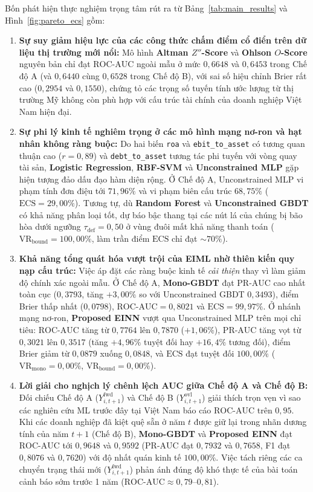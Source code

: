 \documentclass[11pt,a4paper]{article}
\begin{document}
Bốn phát hiện thực nghiệm trọng tâm rút ra từ Bảng~\ref{tab:main_results} và Hình~\ref{fig:pareto_ecs} gồm:
\begin{enumerate}
    \item \textbf{Sự suy giảm hiệu lực của các công thức chấm điểm cổ điển trên dữ liệu thị trường mới nổi:} Mô hình \textbf{Altman $Z''$-Score} và \textbf{Ohlson $O$-Score} nguyên bản chỉ đạt $\text{ROC-AUC}$ ngoài mẫu ở mức $0,6648$ và $0,6453$ trong Chế độ A (và $0,6440$ cùng $0,6528$ trong Chế độ B), với sai số hiệu chỉnh Brier rất cao ($0,2954$ và $0,1550$), chứng tỏ các trọng số tuyến tính ước lượng từ thị trường Mỹ không còn phù hợp với cấu trúc tài chính của doanh nghiệp Việt Nam hiện đại.
    \item \textbf{Sự phi lý kinh tế nghiêm trọng ở các mô hình mạng nơ-ron và hạt nhân không ràng buộc:} Do hai biến \texttt{roa} và \texttt{ebit\_to\_asset} có tương quan thuận cao ($r = 0,89$) và \texttt{debt\_to\_asset} tương tác phi tuyến với vòng quay tài sản, \textbf{Logistic Regression}, \textbf{RBF-SVM} và \textbf{Unconstrained MLP} gặp hiện tượng đảo dấu đạo hàm diện rộng. Ở Chế độ A, Unconstrained MLP vi phạm tính đơn điệu tới $71,96\%$ và vi phạm biên cấu trúc $68,75\%$ ($\text{ECS} = 29,00\%$). Tương tự, dù \textbf{Random Forest} và \textbf{Unconstrained GBDT} có khả năng phân loại tốt, dự báo bậc thang tại các nút lá của chúng bị bão hòa dưới ngưỡng $\tau_{\text{def}} = 0,50$ ở vùng đuôi mất khả năng thanh toán ($\text{VR}_{\text{bound}} = 100,00\%$, làm trần điểm $\text{ECS}$ chỉ đạt $\sim 70\%$).
    \item \textbf{Khả năng tổng quát hóa vượt trội của EIML nhờ thiên kiến quy nạp cấu trúc:} Việc áp đặt các ràng buộc kinh tế \textit{cải thiện} thay vì làm giảm độ chính xác ngoài mẫu. Ở Chế độ A, \textbf{Mono-GBDT} đạt $\text{PR-AUC}$ cao nhất toàn cục ($0,3793$, tăng $+3,00\%$ so với Unconstrained GBDT $0,3493$), điểm Brier thấp nhất ($0,0798$), $\text{ROC-AUC} = 0,8021$ và $\text{ECS} = 99,97\%$. Ở nhánh mạng nơ-ron, \textbf{Proposed EINN} vượt qua Unconstrained MLP trên mọi chỉ tiêu: $\text{ROC-AUC}$ tăng từ $0,7764$ lên $0,7870$ ($+1,06\%$), $\text{PR-AUC}$ tăng vọt từ $0,3021$ lên $0,3517$ (tăng $+4,96\%$ tuyệt đối hay $+16,4\%$ tương đối), điểm Brier giảm từ $0,0879$ xuống $0,0848$, và $\text{ECS}$ đạt tuyệt đối $100,00\%$ ($\text{VR}_{\text{mono}} = 0,00\%$, $\text{VR}_{\text{bound}} = 0,00\%$).
    \item \textbf{Lời giải cho nghịch lý chênh lệch AUC giữa Chế độ A và Chế độ B:} Đối chiếu Chế độ A ($Y_{i,t+1}^{\text{fwd}}$) và Chế độ B ($Y_{i,t+1}^{\text{ovl}}$) giải thích trọn vẹn vì sao các nghiên cứu ML trước đây tại Việt Nam \citep[ví dụ:][]{tran2022explainable} báo cáo $\text{ROC-AUC}$ trên $0,95$. Khi các doanh nghiệp đã kiệt quệ sẵn ở năm $t$ được giữ lại trong nhãn dương tính của năm $t+1$ (Chế độ B), \textbf{Mono-GBDT} và \textbf{Proposed EINN} đạt $\text{ROC-AUC}$ tới $0,9648$ và $0,9592$ ($\text{PR-AUC}$ đạt $0,7932$ và $0,7658$, F1 đạt $0,8076$ và $0,7620$) với độ nhất quán kinh tế $100,00\%$. Việc tách riêng các ca chuyển trạng thái mới ($Y_{i,t+1}^{\text{fwd}}$) phản ánh đúng độ khó thực tế của bài toán cảnh báo sớm trước 1 năm ($\text{ROC-AUC} \approx 0,79\text{--}0,81$).
\end{enumerate}
\end{document}
